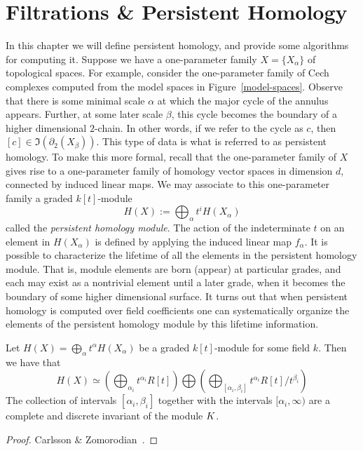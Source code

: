\chapter{Filtrations \& Persistent Homology}
In this chapter we will define persistent homology, and provide some algorithms for computing it. Suppose we have a one-parameter family $X = \{ X_\alpha \}$ of topological spaces. For example, consider the one-parameter family of Cech complexes computed from the model spaces in Figure~\ref{model-spaces}. Observe that there is some minimal scale $\alpha$ at which the major cycle of the annulus appears. Further, at some later scale $\beta$, this cycle becomes the boundary of a higher dimensional $2$-chain. In other words, if we refer to the cycle as $c$, then $[c] \in \Im(\partial_2(X_\beta))$. This type of data is what is referred to as persistent homology. To make this more formal, recall that the one-parameter family of $X$ gives rise to a one-parameter family of homology vector spaces in dimension $d$, connected by induced linear maps. We may associate to this one-parameter family a graded $k[t]$-module \[ H(X) := \bigoplus_\alpha t^i H(X_\alpha) \] called the \emph{persistent homology module}. The action of the indeterminate $t$ on an element in $H(X_\alpha)$ is defined by applying the induced linear map $f_\alpha$. It is possible to characterize the lifetime of all the elements in the persistent homology module. That is, module elements are born (appear) at particular grades, and each may exist as a nontrivial element until a later grade, when it becomes the boundary of some higher dimensional surface. It turns out that when persistent homology is computed over field coefficients one can systematically organize the elements of the persistent homology module by this lifetime information. 
\begin{theorem} Let $H(X) = \bigoplus_\alpha t^\alpha H(X_\alpha)$ be a graded $k[t]$-module for some field $k$. Then we have that 
\[ H(X) \simeq \left( \bigoplus_{\alpha_i}t^{\alpha_i}R[t] \right) \bigoplus \left( \bigoplus_{[\alpha_i, \beta_i]} t^{\alpha_i}R[t]/t^{\beta_i}  \right)  \]
The collection of intervals $[\alpha_i,\beta_i]$ together with the intervals $[\alpha_i, \infty)$ are a complete and discrete invariant 
of the module $K$. 
\end{theorem}
\begin{proof}
Carlsson \& Zomorodian~\cite{zc-cph-04}.
\end{proof}
